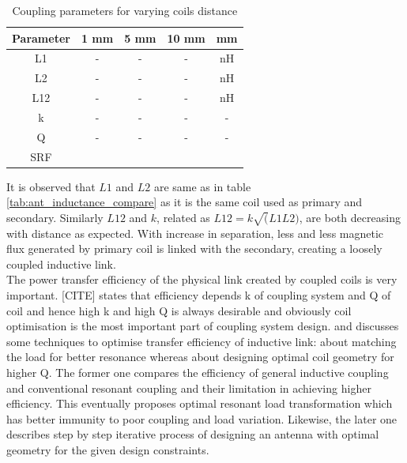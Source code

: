 \documentclass[12pt,a4paper,UKenglish]{article}
\begin{document}
\begin{table}[H]
\caption{Coupling parameters for varying coils distance}
\begin{center}
\begin{tabular}{c|c|c|c|c}
\hline \hline
Parameter 	& 1 mm	& 5 mm 	& 10 mm	 & \si{\milli\meter}\\ \hline
L1		& -	& -	& -	 & \si{\nano\henry} \\ \hline
L2		& -	& -	& -	 & \si{\nano\henry} \\ \hline
L12		& -	& -	& -	 & \si{\nano\henry} \\ \hline
k		& -	& -	& -	 & -		    \\ \hline
Q		& -	& -	& -	 & -		    \\	\hline
SRF		&	&	&	 &		\\
\hline \hline
\end{tabular}
\end{center}
\label{tab:ant_couple_parameter}
\end{table}%

It is observed that $L1$ and $L2$ are same as in table \ref{tab:ant_inductance_compare} as it is the same coil used as primary 
and secondary. Similarly $L12$ and $k$, related as $L12 = k\sqrt(L1L2)$, are both decreasing with distance as expected. With 
increase in separation, less and less magnetic flux generated by primary coil is linked with the secondary, creating a loosely
coupled inductive link. \\

The power transfer efficiency of the physical link created by coupled coils is very important. [CITE] states 
that efficiency depends k of coupling system and Q of coil and hence high k and high Q is always desirable and obviously 
coil optimisation is the most important part of coupling system design. \cite{ant_optimal_resonance} and \cite{ant_PSC_geometry} 
discusses some techniques to optimise transfer efficiency of inductive link: \cite{ant_optimal_resonance} about matching the 
load for better resonance whereas \cite{ant_PSC_geometry} about designing optimal coil geometry for higher Q. The former one 
compares the efficiency of general inductive coupling and conventional resonant coupling and their limitation in achieving 
higher efficiency. This eventually proposes optimal resonant load transformation which has better immunity to poor coupling 
and load variation. Likewise, the later one describes step by step iterative process of designing an antenna with optimal geometry for the given 
design constraints. \\
\end{document}
